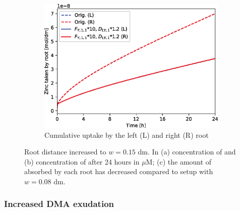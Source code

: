 \documentclass[11pt]{article}
\numberwithin{equation}{section}
\begin{document}
\begin{figure}[h]
\begin{subfigure}[t]{0.31\textwidth}
     \caption{}
     \label{fig:wup_Zn}
     \end{subfigure}
    \begin{subfigure}[t]{0.37\textwidth}
    \includegraphics[width=\textwidth]{Figures/testpics/ZnCumulative/IncreasedDistanceCumuZn.eps}
    \caption{Cumulative  uptake by the left (L) and right (R) root}
    \end{subfigure}
    \caption{Root distance increased to $w=0.15$ \si{dm}. In (a) concentration of  and (b) concentration of  after 24 hours in $\mu$M; (c) the amount of  absorbed by each root has decreased compared to setup with $w=0.08$ \si{dm}.}
\end{figure}

\subsubsection{Increased DMA exudation}
\end{document}
